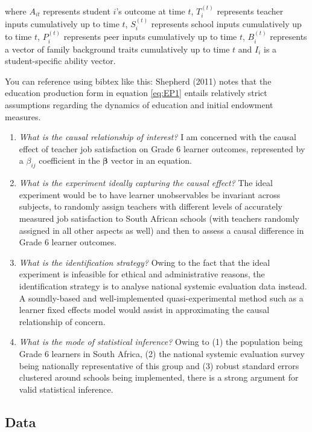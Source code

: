 \documentclass[12pt,preprint, authoryear]{article}
\numberwithin{equation}{section}
\numberwithin{figure}{section}
\numberwithin{table}{section}
\begin{document}
where \(A_{it}\) represents student \(i\)'s outcome at time \(t\),
\(T_i^{(t)}\) represents teacher inputs cumulatively up to time \(t\),
\(S_i^{(t)}\) represents school inputs cumulatively up to time \(t\),
\(P_i^{(t)}\) represents peer inputs cumulatively up to time \(t\),
\(B_i^{(t)}\) represents a vector of family background traits
cumulatively up to time \(t\) and \(I_i\) is a student-specific ability
vector.

You can reference using bibtex like this: Shepherd (2011) notes that the
education production form in equation \ref{eq:EP1} entails relatively
strict assumptions regarding the dynamics of education and initial
endowment measures.

\begin{enumerate}
\def\labelenumi{\arabic{enumi}.}
\item
  \emph{What is the causal relationship of interest?} I am concerned
  with the causal effect of teacher job satisfaction on Grade 6 learner
  outcomes, represented by a \(\beta_{ij}\) coefficient in the
  \(\boldsymbol\beta\) vector in an equation.
\item
  \emph{What is the experiment ideally capturing the causal effect?} The
  ideal experiment would be to have learner unobservables be invariant
  across subjects, to randomly assign teachers with different levels of
  accurately measured job satisfaction to South African schools (with
  teachers randomly assigned in all other aspects as well) and then to
  assess a causal difference in Grade 6 learner outcomes.
\item
  \emph{What is the identification strategy?} Owing to the fact that the
  ideal experiment is infeasible for ethical and administrative reasons,
  the identification strategy is to analyse national systemic evaluation
  data instead. A soundly-based and well-implemented quasi-experimental
  method such as a learner fixed effects model would assist in
  approximating the causal relationship of concern.
\item
  \emph{What is the mode of statistical inference?} Owing to (1) the
  population being Grade 6 learners in South Africa, (2) the national
  systemic evaluation survey being nationally representative of this
  group and (3) robust standard errors clustered around schools being
  implemented, there is a strong argument for valid statistical
  inference.
\end{enumerate}

\subsection{\texorpdfstring{Data \label{Desc}}{Data }}\label{data}
\end{document}
